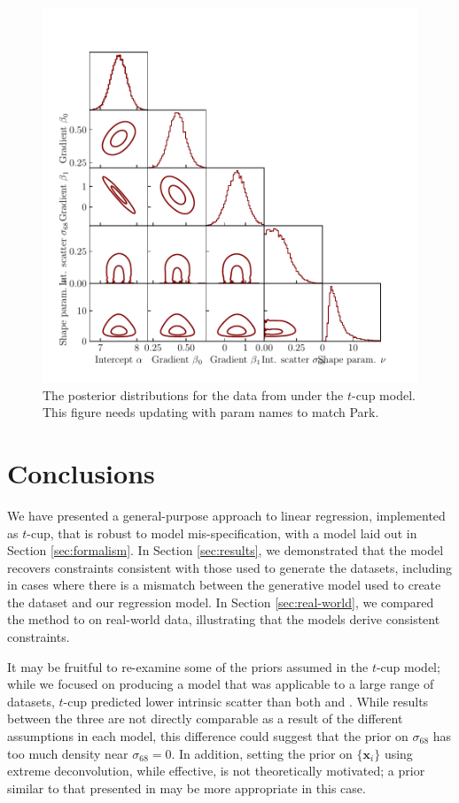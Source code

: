 \documentclass[fleqn,usenatbib]{rasti}
\begin{document}
\begin{figure}
    \includegraphics[width=\columnwidth]{graphics/real/corner_park_fwhm.pdf}
    \caption{The posterior distributions for the data from \citet{Park:2017}
    under the $t$-cup model. {\color{red} This figure
    needs updating with param names to match Park.}}
    \label{fig:real-world.park.corner}
\end{figure}

\section{Conclusions}
\label{sec:conclusion}

We have presented a general-purpose approach to linear regression, implemented
as $t$-cup, that is robust to model mis-specification, with a model laid out in
Section \ref{sec:formalism}. In Section \ref{sec:results}, we demonstrated that
the model recovers constraints consistent with those used to generate the
datasets, including in cases where there is a mismatch between the generative
model used to create the dataset and our regression model. In Section
\ref{sec:real-world}, we compared the method to \citet{Kelly:2007, Park:2017} on
real-world data, illustrating that the models derive consistent constraints.

It may be fruitful to re-examine some of the priors assumed in the $t$-cup
model; while we focused on producing a model that was applicable to a large
range of datasets, $t$-cup predicted lower intrinsic scatter than both
\citet{Kelly:2007} and \citet{Park:2017}. While results between the three are
not directly comparable as a result of the different assumptions in each model,
this difference could suggest that the prior on $\sigma_{68}$ has too much
density near $\sigma_{68} = 0$. In addition, setting the prior on
$\{\mathbf{x}_i\}$ using extreme deconvolution, while effective, is not
theoretically motivated; a prior similar to that presented in
\citet{Bartlett:2023} may be more appropriate in this case.
\end{document}

